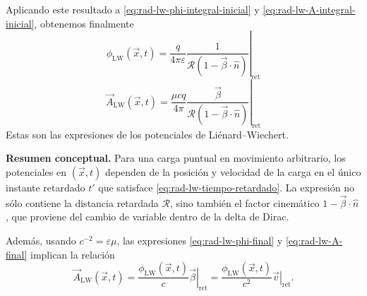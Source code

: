 \documentclass[../main.tex]{subfiles}
\begin{document}
Aplicando este resultado a \eqref{eq:rad-lw-phi-integral-inicial} y \eqref{eq:rad-lw-A-integral-inicial}, obtenemos finalmente
\begin{equation}
    \boxed{
    \phi_{\mathrm{LW}}(\vec x,t)=
    \frac{q}{4\pi\varepsilon}
    \left.\frac{1}{\mathcal R(1-\vec\beta\cdot\hat n)}\right|_{\mathrm{ret}}
    }
    \label{eq:rad-lw-phi-final}
\end{equation}
\begin{equation}
    \boxed{
    \vec A_{\mathrm{LW}}(\vec x,t)=
    \frac{\mu c q}{4\pi}
    \left.\frac{\vec\beta}{\mathcal R(1-\vec\beta\cdot\hat n)}\right|_{\mathrm{ret}}
    }
    \label{eq:rad-lw-A-final}
\end{equation}
Estas son las expresiones de los potenciales de Liénard--Wiechert.

\begin{cajaidea}
\textbf{Resumen conceptual.} Para una carga puntual en movimiento arbitrario, los potenciales en $(\vec x,t)$ dependen de la posición y velocidad de la carga en el único instante retardado $t'$ que satisface \eqref{eq:rad-lw-tiempo-retardado}. La expresión no sólo contiene la distancia retardada $\mathcal R$, sino también el factor cinemático $1-\vec\beta\cdot\hat n$, que proviene del cambio de variable dentro de la delta de Dirac.
\end{cajaidea}

Además, usando $c^{-2}=\varepsilon\mu$, las expresiones \eqref{eq:rad-lw-phi-final} y \eqref{eq:rad-lw-A-final} implican la relación
\begin{equation}
    \boxed{
    \vec A_{\mathrm{LW}}(\vec x,t)=
    \frac{\phi_{\mathrm{LW}}(\vec x,t)}{c}\left.\vec\beta\right|_{\mathrm{ret}}
    =\frac{\phi_{\mathrm{LW}}(\vec x,t)}{c^2}\left.\vec v\right|_{\mathrm{ret}}.
    }
    \label{eq:rad-lw-relacion-A-phi}
\end{equation}
\end{document}
